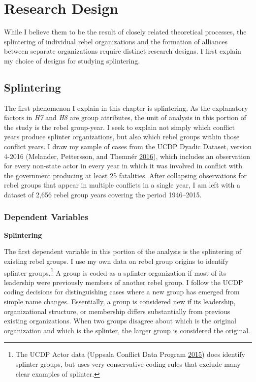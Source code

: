 \documentclass[12pt,]{book}
\let\rmarkdownfootnote\footnote%
\def\footnote{\protect\rmarkdownfootnote}
\theoremstyle{definition}
\theoremstyle{definition}
\theoremstyle{remark}
\begin{document}
\section{Research Design}\label{research-design}

While I believe them to be the result of closely related theoretical
processes, the splintering of individual rebel organizations and the
formation of alliances between separate organizations require distinct
research designs. I first explain my choice of designs for studying
splintering.

\subsection{Splintering}\label{splintering}

The first phenomenon I explain in this chapter is splintering. As the
explanatory factors in \emph{H7} and \emph{H8} are group attributes, the
unit of analysis in this portion of the study is the rebel group-year. I
seek to explain not simply which conflict years produce splinter
organizations, but also which rebel groups within those conflict years.
I draw my sample of cases from the UCDP Dyadic Dataset, version 4-2016
(Melander, Pettersson, and Themnér
\protect\hyperlink{ref-Melander2016}{2016}), which includes an
observation for every non-state actor in every year in which it was
involved in conflict with the government producing at least 25
fatalities. After collapsing observations for rebel groups that appear
in multiple conflicts in a single year, I am left with a dataset of
2,656 rebel group years covering the period 1946--2015.

\subsubsection*{Dependent Variables}\label{dependent-variables}

\textbf{Splintering}

The first dependent variable in this portion of the analysis is the
splintering of existing rebel groups. I use my own data on rebel group
origins to identify splinter groups.\footnote{The UCDP Actor data
  (Uppsala Conflict Data Program
  \protect\hyperlink{ref-ucdpactor}{2015}) does identify splinter
  groups, but uses very conservative coding rules that exclude many
  clear examples of splinter.} A group is coded as a splinter
organization if most of its leadership were previously members of
another rebel group. I follow the UCDP coding decisions for
distinguishing cases where a new group has emerged from simple name
changes. Essentially, a group is considered new if its leadership,
organizational structure, or membership differs substantially from
previous existing organizations. When two groups disagree about which is
the original organization and which is the splinter, the larger group is
considered the original.
\end{document}
